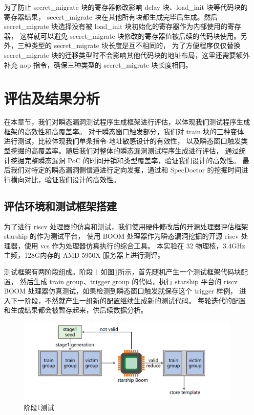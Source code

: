 为了防止 secret\_migrate 块的寄存器修改影响 delay 块、load\_init 块等代码块的寄存器结果，
secert\_migrate 块在其他所有块都生成完毕后生成。然后 secret\_migrate 块选择没有被 load\_init 块初始化的寄存器作为内部使用的寄存器，
这样就可以避免 secret\_migrate 块修改的寄存器值被后续的代码块使用。另外，三种类型的 secret\_migrate 块长度是互不相同的，
为了方便程序仅仅替换 secret\_migrate 块的迁移类型时不会影响其他代码块的地址布局，这里还需要额外补充 nop 指令，确保三种类型的 secret\_migrate 块长度相同。\par

\section{评估及结果分析}

在本章节，我们对瞬态漏洞测试程序生成框架进行评估，以体现我们测试程序生成框架的高效性和高覆盖率。
对于瞬态窗口触发部分，我们对 train 块的三种变体进行测试，比较体现我们单条指令-地址敏感设计的有效性，
以及瞬态窗口触发类型挖掘的高覆盖率。随后我们对整体的瞬态漏洞测试程序生成进行评估，
通过统计挖掘完整瞬态漏洞 PoC 的时间开销和类型覆盖率，验证我们设计的高效性。
最后我们对特定的瞬态漏洞侧信道进行定向发掘，通过和 SpecDoctor 的挖掘时间进行横向对比，验证我们设计的高效性。\par

\subsection{评估环境和测试框架搭建}

为了进行 riscv 处理器的仿真和测试，我们使用硬件修改后的开源处理器评估框架 starship 的作为测试平台，
使用 BOOM 处理器作为瞬态漏洞挖掘的开源 riscv 处理器，使用 vcs 作为处理器仿真执行的综合工具。
本实验在 32 物理核，3.4GHz主频，128G内存的 AMD 5950X 服务器上进行测评。\par

测试框架有两阶段组成。阶段 1 如图\ref{paper:stage1-test}所示，首先随机产生一个测试框架代码块配置，
然后生成 train group、trigger group 的代码，执行 starship 平台的
riscv BOOM 处理器仿真测试，如果检测到瞬态窗口触发就保存这个 trigger 样例，
进入下一阶段，不然就产生一组新的配置继续生成新的测试代码。
每轮迭代的配置和生成结果都会被暂存起来，供后续数据分析。\par

\begin{figure}[!h]
    \centering
    \includegraphics[width=\linewidth]{figure/paper/stage1-test.png}
    \caption{阶段1测试}
    \label{paper:stage1-test}
\end{figure}

